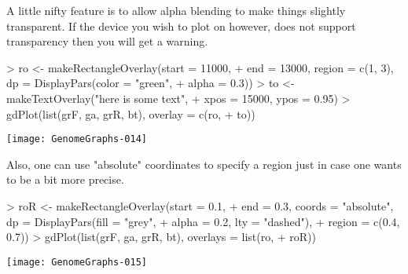\documentclass[11pt]{article}
\begin{document}
A little nifty feature is to allow alpha blending to make things
slightly transparent. If the device you wish to plot on however, does
not support transparency then you will get a warning. 

\begin{Schunk}
\begin{Sinput}
> ro <- makeRectangleOverlay(start = 11000, 
+     end = 13000, region = c(1, 3), dp = DisplayPars(color = "green", 
+         alpha = 0.3))
> to <- makeTextOverlay("here is some text", 
+     xpos = 15000, ypos = 0.95)
> gdPlot(list(grF, ga, grR, bt), overlay = c(ro, 
+     to))
\end{Sinput}
\end{Schunk}
\texttt{[image: GenomeGraphs-014]}

Also, one can use "absolute" coordinates to specify a region just in
case one wants to be a bit more precise. 
\begin{Schunk}
\begin{Sinput}
> roR <- makeRectangleOverlay(start = 0.1, 
+     end = 0.3, coords = "absolute", dp = DisplayPars(fill = "grey", 
+         alpha = 0.2, lty = "dashed"), 
+     region = c(0.4, 0.7))
> gdPlot(list(grF, ga, grR, bt), overlays = list(ro, 
+     roR))
\end{Sinput}
\end{Schunk}
\texttt{[image: GenomeGraphs-015]}
\end{document}
